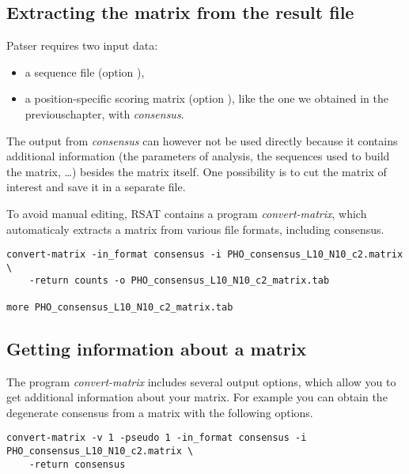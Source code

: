 \subsection{Extracting the matrix from the  result file}

Patser requires two input data:  

\begin{itemize}
\item a sequence file (option ),
\item a position-specific scoring matrix (option ), like
  the one we obtained in the previouschapter, with \textit{consensus}.
\end{itemize}

The output from \textit{consensus} can however not be used directly
because it contains additional information (the parameters of
analysis, the sequences used to build the matrix, \ldots) besides the
matrix itself. One possibility is to cut the matrix of interest and
save it in a separate file.

To avoid manual editing, RSAT contains a program
\textit{convert-matrix}, which automaticaly extracts a matrix from
various file formats, including consensus.

{\color{Blue} \begin{footnotesize} 
\begin{verbatim}
convert-matrix -in_format consensus -i PHO_consensus_L10_N10_c2.matrix  \
    -return counts -o PHO_consensus_L10_N10_c2_matrix.tab

more PHO_consensus_L10_N10_c2_matrix.tab
\end{verbatim} \end{footnotesize}
}

\subsection{Getting information about a matrix}

The program \textit{convert-matrix} includes several output options,
which allow you to get additional information about your matrix. For
example you can obtain the degenerate consensus from a matrix with the
following options.

{\color{Blue} \begin{footnotesize} 
\begin{verbatim}
convert-matrix -v 1 -pseudo 1 -in_format consensus -i PHO_consensus_L10_N10_c2.matrix \
    -return consensus
\end{verbatim} \end{footnotesize}
}


